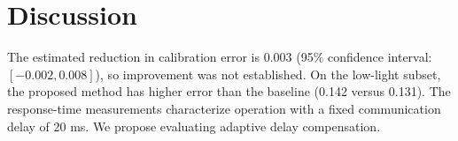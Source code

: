 \section{Discussion}
The estimated reduction in calibration error is 0.003 (95\% confidence interval: $[-0.002,0.008]$), so improvement was not established. On the low-light subset, the proposed method has higher error than the baseline (0.142 versus 0.131). The response-time measurements characterize operation with a fixed communication delay of 20 ms. We propose evaluating adaptive delay compensation.
